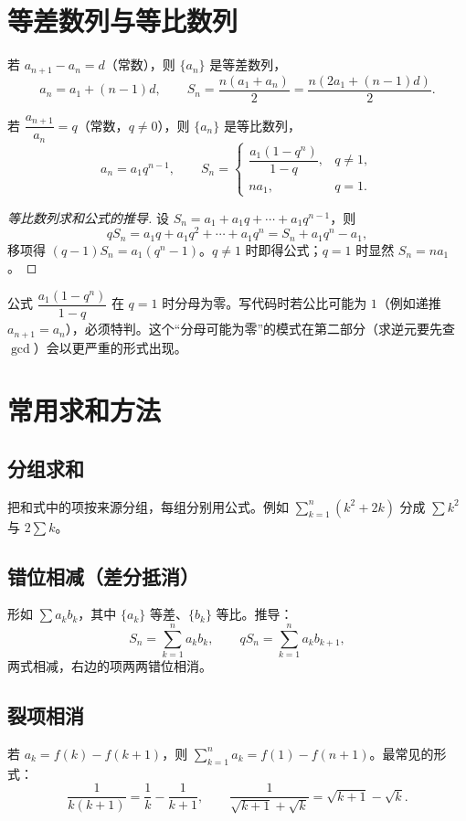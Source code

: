 \section{等差数列与等比数列}
\begin{definition}[等差数列]
若 $a_{n+1}-a_n=d$（常数），则 $\{a_n\}$ 是等差数列，
\[
a_n=a_1+(n-1)d,\qquad S_n=\frac{n(a_1+a_n)}2=\frac{n(2a_1+(n-1)d)}2.
\]
\end{definition}
\begin{definition}[等比数列]
若 $\dfrac{a_{n+1}}{a_n}=q$（常数，$q\ne0$），则 $\{a_n\}$ 是等比数列，
\[
a_n=a_1q^{n-1},\qquad
S_n=\begin{cases}
\dfrac{a_1(1-q^n)}{1-q},&q\ne1,\\[2mm]
na_1,&q=1.
\end{cases}
\]
\end{definition}
\begin{proof}[等比数列求和公式的推导]
设 $S_n=a_1+a_1q+\cdots+a_1q^{n-1}$，则
\[
qS_n=a_1q+a_1q^2+\cdots+a_1q^n=S_n+a_1q^n-a_1,
\]
移项得 $(q-1)S_n=a_1(q^n-1)$。$q\ne1$ 时即得公式；$q=1$ 时显然 $S_n=na_1$。
\end{proof}

\begin{pitfall}
公式 $\dfrac{a_1(1-q^n)}{1-q}$ 在 $q=1$ 时分母为零。写代码时若公比可能为 $1$（例如递推 $a_{n+1}=a_n$），必须特判。这个“分母可能为零”的模式在第二部分（求逆元要先查 $\gcd$）会以更严重的形式出现。
\end{pitfall}

\section{常用求和方法}
\subsection{分组求和}
把和式中的项按来源分组，每组分别用公式。例如 $\sum_{k=1}^n(k^2+2k)$ 分成 $\sum k^2$ 与 $2\sum k$。

\subsection{错位相减（差分抵消）}
形如 $\sum a_kb_k$，其中 $\{a_k\}$ 等差、$\{b_k\}$ 等比。推导：
\[
S_n=\sum_{k=1}^n a_kb_k,\qquad qS_n=\sum_{k=1}^n a_kb_{k+1},
\]
两式相减，右边的项两两错位相消。

\subsection{裂项相消}
若 $a_k=f(k)-f(k+1)$，则 $\sum_{k=1}^n a_k=f(1)-f(n+1)$。最常见的形式：
\[
\frac1{k(k+1)}=\frac1k-\frac1{k+1},\qquad
\frac1{\sqrt{k+1}+\sqrt k}=\sqrt{k+1}-\sqrt k.
\]


